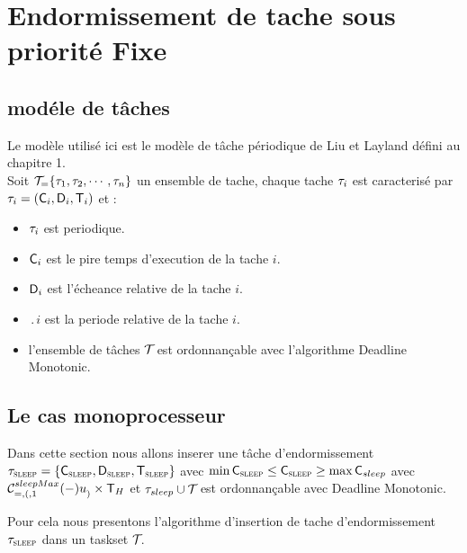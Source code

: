 \chapter{Endormissement de tache sous priorité Fixe}
\minitoc
\section{modéle de tâches}
Le modèle utilisé ici est le modèle de tâche périodique de Liu et
Layland défini au chapitre 1.\\ Soit $\mathcal{T}_{=}
\{\tau_{1},\tau_{2},\cdots,\tau_{n}\}$ un ensemble de tache, chaque
tache $\tau_{i}$ est caracterisé par $\tau_{i} =
(\mathsf{C}_{i},\mathsf{D}_{i},\mathsf{T}_{i})$ et :
\begin{itemize}
\item $\tau_{i}$ est periodique.
\item $\mathsf{C}_{i}$ est le pire temps d'execution de la tache $i$.
\item $\mathsf{D}_{i}$ est l'écheance relative de la tache $i$.
\item $\period{i}$ est la periode relative de la tache $i$.
\item l'ensemble de tâches $\mathcal{T}_{}$ est ordonnançable avec
  l'algorithme Deadline Monotonic.
\end{itemize}
\section{Le cas monoprocesseur}
Dans cette section nous allons inserer une tâche d'endormissement
$\tau_{\textsc{sleep}} = \{ \mathsf{C}_{\textsc{sleep}}, \mathsf{D}_{\textsc{sleep}},
\mathsf{T}_{\textsc{sleep}}\}$ avec $\min \mathsf{C}_{\textsc{sleep}} \leq \mathsf{C}_{\textsc{sleep}}
\geq \max \mathsf{C}_{sleep}$ avec $\mathcal{C}^{sleepMax}_{=,(,1}(-)u^{}_{)} \times
\mathsf{T}_{H}$ et $\tau_{sleep} \cup \mathcal{T}_{}$ est ordonnançable avec
Deadline Monotonic.


Pour cela nous presentons l'algorithme d'insertion de tache
d'endormissement $\tau_{\textsc{sleep}}$ dans un taskset $\mathcal{T}_{}$.












